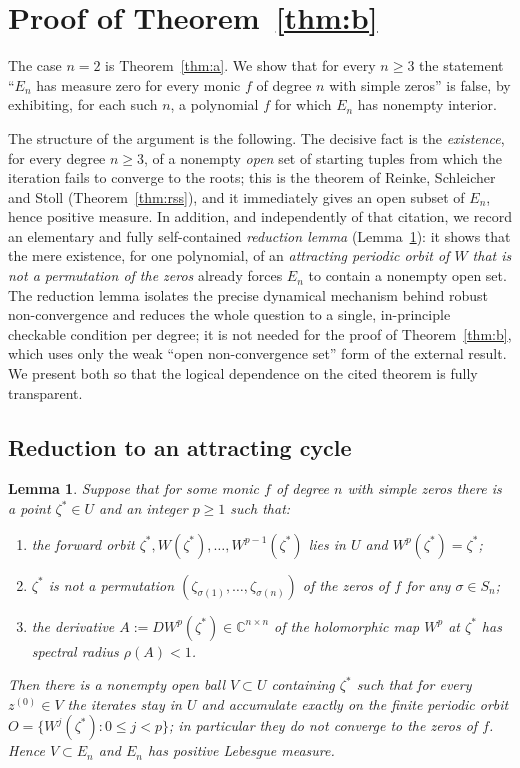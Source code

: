 \documentclass{amsart}
\newtheorem{lemma}{Lemma}
\theoremstyle{definition}
\theoremstyle{remark}
\newcommand{\C}{\mathbb{C}}
\begin{document}
\section{Proof of Theorem~\ref{thm:b}}

The case $n=2$ is Theorem~\ref{thm:a}. We show that for every $n\ge3$ the statement
``$E_n$ has measure zero for every monic $f$ of degree $n$ with simple zeros'' is false, by
exhibiting, for each such $n$, a polynomial $f$ for which $E_n$ has nonempty interior.

The structure of the argument is the following. The decisive fact is the \emph{existence},
for every degree $n\ge3$, of a nonempty \emph{open} set of starting tuples from which the
iteration fails to converge to the roots; this is the theorem of Reinke, Schleicher and Stoll
(Theorem~\ref{thm:rss}), and it immediately gives an open subset of $E_n$, hence positive
measure. In addition, and independently of that citation, we record an elementary and fully
self-contained \emph{reduction lemma} (Lemma~\ref{lem:attr}): it shows that the mere
existence, for one polynomial, of an \emph{attracting periodic orbit of $W$ that is not a
permutation of the zeros} already forces $E_n$ to contain a nonempty open set. The reduction
lemma isolates the precise dynamical mechanism behind robust non-convergence and reduces the
whole question to a single, in-principle checkable condition per degree; it is not needed for
the proof of Theorem~\ref{thm:b}, which uses only the weak ``open non-convergence set'' form
of the external result. We present both so that the logical dependence on the cited theorem is
fully transparent.

\subsection{Reduction to an attracting cycle}

\begin{lemma}\label{lem:attr}
Suppose that for some monic $f$ of degree $n$ with simple zeros there is a point
$\zeta^{*}\in U$ and an integer $p\ge1$ such that:
\begin{enumerate}
\item the forward orbit $\zeta^{*},W(\zeta^{*}),\dots,W^{p-1}(\zeta^{*})$ lies in $U$ and
$W^{p}(\zeta^{*})=\zeta^{*}$;
\item $\zeta^{*}$ is \emph{not} a permutation
$(\zeta_{\sigma(1)},\dots,\zeta_{\sigma(n)})$ of the zeros of $f$ for any $\sigma\in S_n$;
\item the derivative $A:=DW^{p}(\zeta^{*})\in\C^{n\times n}$ of the holomorphic map $W^{p}$
at $\zeta^{*}$ has spectral radius $\rho(A)<1$.
\end{enumerate}
Then there is a nonempty open ball $V\subset U$ containing $\zeta^{*}$ such that for every
$z^{(0)}\in V$ the iterates stay in $U$ and accumulate exactly on the finite periodic orbit
$O=\{W^{j}(\zeta^{*}):0\le j<p\}$; in particular they do not converge to the zeros of $f$.
Hence $V\subset E_n$ and $E_n$ has positive Lebesgue measure.
\end{lemma}
\end{document}
